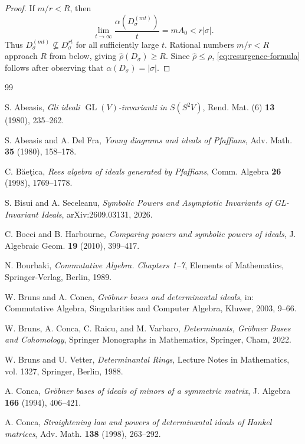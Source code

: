 \documentclass[11pt,reqno]{amsart}
\numberwithin{equation}{subsection}
\theoremstyle{definition}
\theoremstyle{remark}
\DeclareMathOperator{\GL}{GL}
\begin{document}
\begin{proof}
If $m/r<R$, then
\[
\lim_{t\to \infty} \frac{\alpha(D_\sigma^{(mt)})}{t}= mA_0<r|\sigma|.
\]
Thus $D_\sigma^{(mt)}\not\subseteq D_\sigma^{rt}$ for all sufficiently
large $t$. Rational numbers $m/r<R$ approach $R$ from below, giving
$\widehat\rho(D_\sigma)\ge R$. Since
$\widehat\rho\le\rho$, \eqref{eq:resurgence-formula} follows after observing that
$\alpha(D_\sigma)=|\sigma|$.
\end{proof}


\begin{thebibliography}{99}

S. Abeasis,
\emph{Gli ideali $\GL(V)$-invarianti in $S(S^2V)$},
Rend. Mat. (6) \textbf{13} (1980), 235--262.

S. Abeasis and A. Del Fra,
\emph{Young diagrams and ideals of Pfaffians},
Adv. Math. \textbf{35} (1980), 158--178.

C. B\u ae\c tica,
\emph{Rees algebra of ideals generated by Pfaffians},
Comm. Algebra \textbf{26} (1998), 1769--1778.

 S. Bisui and A. Seceleanu,
 \emph{Symbolic Powers and Asymptotic Invariants of GL-Invariant Ideals}, arXiv:2609.03131, 2026.

C. Bocci and B. Harbourne,
\emph{Comparing powers and symbolic powers of ideals},
J. Algebraic Geom. \textbf{19} (2010), 399--417.

N. Bourbaki,
\emph{Commutative Algebra. Chapters 1--7},
Elements of Mathematics,
Springer-Verlag, Berlin, 1989.

W. Bruns and A. Conca,
\emph{Gr\"obner bases and determinantal ideals},
in: Commutative Algebra, Singularities and Computer Algebra,
Kluwer, 2003, 9--66.

W. Bruns, A. Conca, C. Raicu, and M. Varbaro,
\emph{Determinants, Gröbner Bases and Cohomology},
Springer Monographs in Mathematics,  Springer, Cham, 2022. 

W. Bruns and U. Vetter,
\emph{Determinantal Rings},
Lecture Notes in Mathematics, vol. 1327, Springer, Berlin, 1988.

A. Conca,
\emph{Gr\"obner bases of ideals of minors of a symmetric matrix},
J. Algebra \textbf{166} (1994), 406--421.


A. Conca,
\emph{Straightening law and powers of determinantal ideals of Hankel
matrices},
Adv. Math. \textbf{138} (1998), 263--292.




\end{thebibliography}
\end{document}
